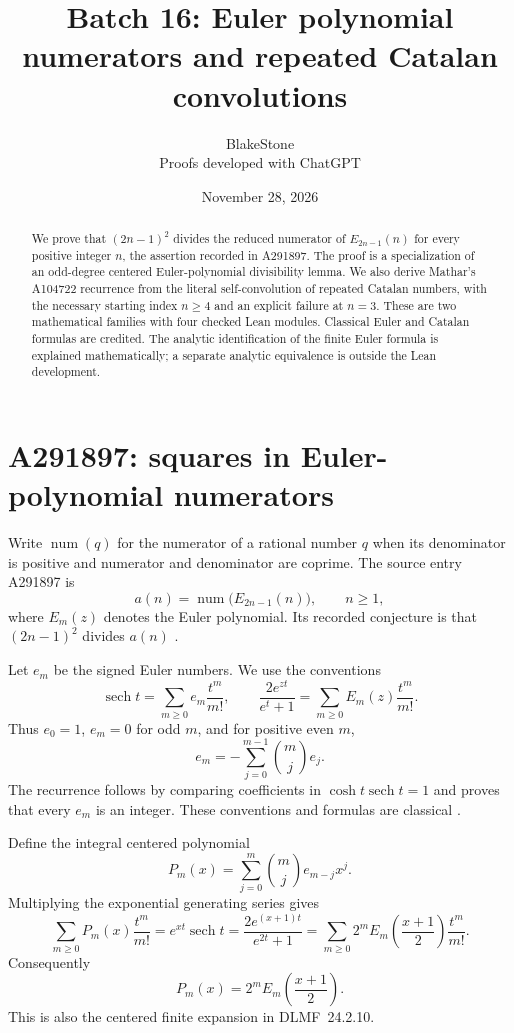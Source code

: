 \documentclass[11pt]{article}
\title{Batch 16: Euler polynomial numerators and repeated Catalan convolutions}
\author{BlakeStone\\\small Proofs developed with ChatGPT}
\date{November 28, 2026}
\begin{document}
\maketitle
\begin{abstract}
We prove that $(2n-1)^2$ divides the reduced numerator of
$E_{2n-1}(n)$ for every positive integer $n$, the assertion recorded
in A291897. The proof is a specialization of an odd-degree centered
Euler-polynomial divisibility lemma. We also derive Mathar's A104722
recurrence from the literal self-convolution of repeated Catalan numbers,
with the necessary starting index $n\ge4$ and an explicit failure at $n=3$.
These are two mathematical families with four checked Lean modules.
Classical Euler and Catalan formulas are credited. The analytic
identification of the finite Euler formula is explained mathematically;
a separate analytic equivalence is outside the Lean development.
\end{abstract}

\section{A291897: squares in Euler-polynomial numerators}

Write $\operatorname{num}(q)$ for the numerator of a rational number $q$
when its denominator is positive and numerator and denominator are coprime.
The source entry A291897 is
\[
 a(n)=\operatorname{num}\bigl(E_{2n-1}(n)\bigr),\qquad n\ge1,
\]
where $E_m(z)$ denotes the Euler polynomial. Its recorded conjecture is
that $(2n-1)^2$ divides $a(n)$ \cite{a291897-source}.

Let $e_m$ be the signed Euler numbers. We use the conventions
\[
 \operatorname{sech}t=\sum_{m\ge0}e_m\frac{t^m}{m!},\qquad
 \frac{2e^{zt}}{e^t+1}=\sum_{m\ge0}E_m(z)\frac{t^m}{m!}.
\]
Thus $e_0=1$, $e_m=0$ for odd $m$, and for positive even $m$,
\[
 e_m=-\sum_{j=0}^{m-1}\binom mj e_j.
\]
The recurrence follows by comparing coefficients in
$\cosh t\operatorname{sech}t=1$ and proves that every $e_m$ is an integer.
These conventions and formulas are classical \cite{a291897-dlmf,a291897-carlitz}.

Define the integral centered polynomial
\begin{equation}\label{eq:euler-centered}
 P_m(x)=\sum_{j=0}^m\binom mj e_{m-j}x^j.
\end{equation}
Multiplying the exponential generating series gives
\[
 \sum_{m\ge0}P_m(x)\frac{t^m}{m!}
 =e^{xt}\operatorname{sech}t
 =\frac{2e^{(x+1)t}}{e^{2t}+1}
 =\sum_{m\ge0}2^m E_m\!\left(\frac{x+1}{2}\right)\frac{t^m}{m!}.
\]
Consequently
\begin{equation}\label{eq:euler-convention}
 P_m(x)=2^mE_m\!\left(\frac{x+1}{2}\right).
\end{equation}
This is also the centered finite expansion in DLMF~24.2.10.
\end{document}

